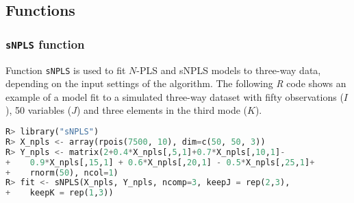 \subsection{Functions}
\subsubsection{\texttt{sNPLS} function}
Function \texttt{sNPLS} is used to fit $N$-PLS and sNPLS models to three-way data, depending on the input settings of the algorithm. The following \textit{R} code shows an example of a model fit to a simulated three-way dataset with fifty observations ($I$), 50 variables ($J$) and three elements in the third mode ($K$).
\vspace{15pt}
\begin{lstlisting}[basicstyle=\small, language=Python, morekeywords={array, matrix, sNPLS, rep, rpois, rnorm}]
R> library("sNPLS")
R> X_npls <- array(rpois(7500, 10), dim=c(50, 50, 3))
R> Y_npls <- matrix(2+0.4*X_npls[,5,1]+0.7*X_npls[,10,1]- 
+    0.9*X_npls[,15,1] + 0.6*X_npls[,20,1] - 0.5*X_npls[,25,1]+
+    rnorm(50), ncol=1)
R> fit <- sNPLS(X_npls, Y_npls, ncomp=3, keepJ = rep(2,3), 
+    keepK = rep(1,3))
\end{lstlisting}

